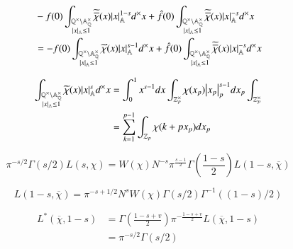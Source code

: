 \documentclass[a4paper, 12pt]{article}
\theoremstyle{Mydefinition}
\theoremstyle{Mytheorem}
\begin{document}
\begin{enumerate}
    \begin{equation}
    \begin{split}
        &-f(0)\int_{\substack{\mathbb{Q}^\times\backslash \mathbb{A}_\mathbb{Q}^\times \\ \abs{x}_\mathbb{A}\leq 1}} \widetilde{\overline{\chi}}(x)\abs{x}_{\mathbb{A}}^{1-s} d^\times x + \hat{f}(0)\int_{\substack{\mathbb{Q}^\times\backslash \mathbb{A}_\mathbb{Q}^\times \\ \abs{x}_\mathbb{A}\leq 1}} \widetilde{\overline{\chi}}(x)\abs{x}_{\mathbb{A}}^{-s} d^\times x\\
        &=-f(0)\int_{\substack{\mathbb{Q}^\times\backslash \mathbb{A}_\mathbb{Q}^\times \\ \abs{x}_\mathbb{A}\leq 1}} \widetilde{\chi}(x)\abs{x}_{\mathbb{A}}^{s-1} d^\times x + \hat{f}(0)\int_{\substack{\mathbb{Q}^\times\backslash \mathbb{A}_\mathbb{Q}^\times \\ \abs{x}_\mathbb{A}\leq 1}} \widetilde{\overline{\chi}}(x)\abs{x}_{\mathbb{A}}^{-s} d^\times x
    \end{split}
    \end{equation}
    
    \begin{equation}
    \begin{split}
        \int_{\substack{\mathbb{Q}^\times\backslash \mathbb{A}_\mathbb{Q}^\times \\ \abs{x}_\mathbb{A}\leq 1}} \widetilde{\chi}(x)\abs{x}_{\mathbb{A}}^{s} d^\times x &= \int_0^1 x^{s-1}dx \int_{\mathbb{Z}^\times_p}\chi(x_p)\abs{x_p}_p^{s-1}dx_p\int_{\mathbb{Z}^\times_p}\\
        &=\sum_{k=1}^{p-1}\int_{\mathbb{Z}_p}\chi(k+px_p)dx_p
    \end{split}
    \end{equation}
    
    \begin{equation}
        \pi^{-s/2}\Gamma(s/2)L(s,\chi) = W(\chi)N^{-s}\pi^{\frac{s-1}{2}}\Gamma\left(\frac{1-s}{2}\right)L(1-s, \overline{\chi})
    \end{equation}
    
    \begin{equation}
        L(1-s, \overline{\chi}) = \pi^{-s+1/2}N^sW(\chi)\Gamma(s/2)\Gamma^{-1}((1-s)/2)
    \end{equation}
    
    \begin{equation}
    \begin{split}
        L^*(\overline{\chi}, 1-s) &= \Gamma\left(\frac{1-s+v}{2}\right)\pi^{-\frac{1-s+v}{2}}L(\overline{\chi}, 1-s)\\
        &=\pi^{-s/2}\Gamma(s/2)
    \end{split}
    \end{equation}
    
    
    
    
\end{enumerate}
\end{document}
